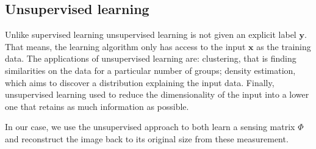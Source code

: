\subsection{Unsupervised learning} \label{sec:unsuperv}
Unlike supervised learning unsupervised learning is not given an explicit label $\mathbf{y}$. That means, the learning algorithm only has access to the input  $\mathbf{x}$ as the training data. The applications of unsupervised learning are: clustering, that is finding similarities on the data for a particular number of groups; density estimation, which aims to discover a distribution explaining the input data. Finally, unsupervised learning used to reduce the dimensionality of the input into a lower one that retains as much information as possible. \

In our case, we use the unsupervised approach to both learn a sensing matrix $\Phi$ and  reconstruct the image back to its original size from these measurement. 
        

